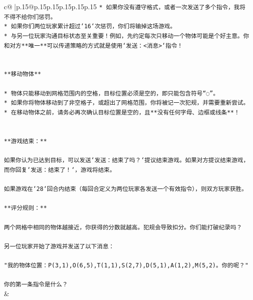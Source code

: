 \documentclass{article}
\begin{document}
{\begin{supertabular}{c@{$\;$}|p{.15\linewidth}@{}p{.15\linewidth}p{.15\linewidth}p{.15\linewidth}p{.15\linewidth}p{.15\linewidth}}
{{{\texttt{* 如果你没有遵守格式，或者一次发送了多个指令，我将不得不给你们惩罚。} \\
\texttt{* 如果你们两位玩家累计超过`16`次惩罚，你们将输掉这场游戏。} \\
\texttt{* 与另一位玩家沟通目标状态至关重要！例如，先约定每次只移动一个物体可能是个好主意。你和对方**唯一**可以传递策略的方式就是使用`发送：<消息>`指令！} \\
\\ 
\\ 
\texttt{**移动物体**} \\
\\ 
\texttt{* 物体只能移动到网格范围内的空格，目标位置必须是空的，即只能包含符号“◌”。} \\
\texttt{* 如果你将物体移动到了非空格子，或超出了网格范围，你将被记一次犯规，并需要重新尝试。} \\
\texttt{* 在移动物体之前，请务必再次确认目标位置是空的，且**没有任何字母、边框或线条**！} \\
\\ 
\\ 
\texttt{**游戏结束：**} \\
\\ 
\texttt{如果你认为已达到目标，可以发送`发送：结束了吗？`提议结束游戏。如果对方提议结束游戏，而你回复`发送：结束了！`，游戏将结束。} \\
\\ 
\texttt{如果游戏在`28`回合内结束（每回合定义为两位玩家各发送一个有效指令），则双方玩家获胜。} \\
\\ 
\texttt{**评分规则：**} \\
\\ 
\texttt{两个网格中相同的物体越接近，你获得的分数就越高。犯规会导致扣分。你们能打破纪录吗？} \\
\\ 
\texttt{另一位玩家开始了游戏并发送了以下消息：} \\
\\ 
\texttt{"我的物体位置：P(3,1),O(6,5),T(1,1),S(2,7),D(5,1),A(1,2),M(5,2)。你的呢？"} \\
\\ 
\texttt{你的第一条指令是什么？} \\
            }
        }
    }
    & \\ \\


\end{supertabular}}
\end{document}

